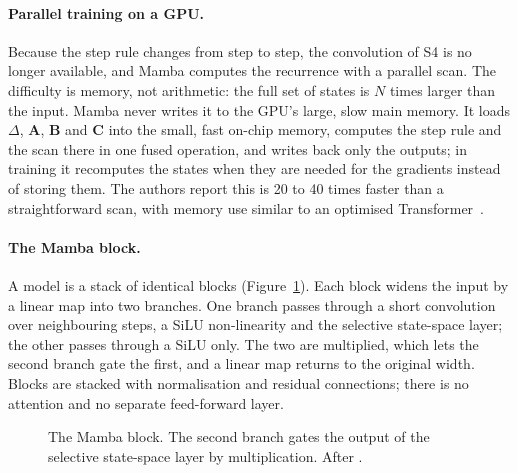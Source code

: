 \paragraph{Parallel training on a GPU.} Because the step rule changes from step to step, the convolution of S4 is no
longer available, and Mamba computes the recurrence with a parallel scan. The difficulty is memory, not arithmetic:
the full set of states is $N$ times larger than the input. Mamba never writes it to the GPU's large, slow main memory.
It loads $\Delta$, $\mathbf{A}$, $\mathbf{B}$ and $\mathbf{C}$ into the small, fast on-chip memory, computes the step
rule and the scan there in one fused operation, and writes back only the outputs; in training it recomputes the states
when they are needed for the gradients instead of storing them. The authors report this is 20 to 40 times faster than
a straightforward scan, with memory use similar to an optimised Transformer~\citep{gu2024mamba}.

\paragraph{The Mamba block.} A model is a stack of identical blocks (Figure~\ref{fig:mamba-block}). Each block widens
the input by a linear map into two branches. One branch passes through a short convolution over neighbouring steps,
a SiLU non-linearity and the selective state-space layer; the other passes through a SiLU only. The two are multiplied,
which lets the second branch gate the first, and a linear map returns to the original width. Blocks are stacked with
normalisation and residual connections; there is no attention and no separate feed-forward layer.

\begin{figure}[!htbp]
\centering
{}
\caption{The Mamba block. The second branch gates the output of the selective state-space layer by multiplication.
After \citet{gu2024mamba}.}
\label{fig:mamba-block}
\end{figure}

